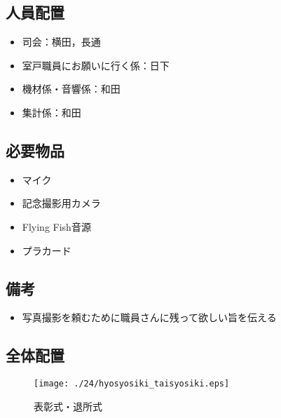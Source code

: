 \subsection{人員配置}
\begin{itemize}
\item 司会：横田，長通
\item 室戸職員にお願いに行く係：日下
\item 機材係・音響係：和田
\item 集計係：和田
\end{itemize}


\subsection{必要物品}
\begin{itemize}
\item マイク
\item 記念撮影用カメラ
\item Flying Fish音源
\item プラカード
\end{itemize}
\subsection{備考}
\begin{itemize}
\item 写真撮影を頼むために職員さんに残って欲しい旨を伝える
\end{itemize}

\subsection{全体配置}
\begin{figure}[htbp]
  \begin{center}
  \texttt{[image: ./24/hyosyosiki\_taisyosiki.eps]}
  \caption{表彰式・退所式}
  \end{center}
\end{figure}

%
